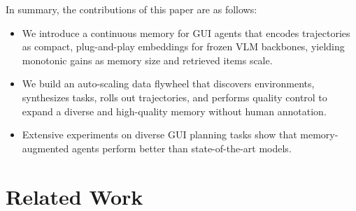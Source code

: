 \documentclass{article} %
\begin{document}
In summary, the contributions of this paper are as follows:
\begin{itemize}
\item We introduce a continuous memory for GUI agents that encodes trajectories as compact, plug-and-play embeddings for frozen VLM backbones, yielding monotonic gains as memory size and retrieved items scale.
\item We build an auto-scaling data flywheel that discovers environments, synthesizes tasks, rolls out trajectories, and performs quality control to expand a diverse and high-quality memory without human annotation.
\item Extensive experiments on diverse GUI planning tasks show that memory-augmented agents perform better than state-of-the-art models.
\end{itemize}



\section{Related Work}
\end{document}
